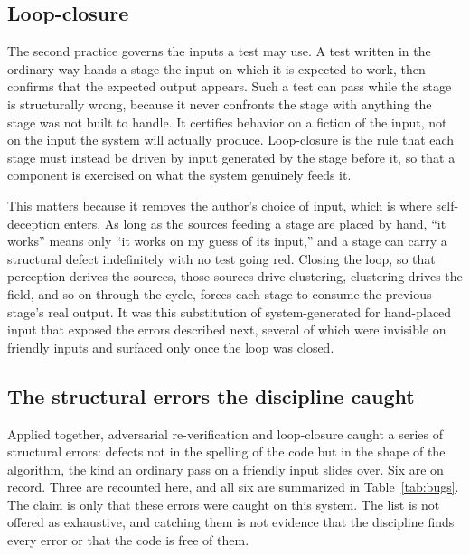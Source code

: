 \documentclass[11pt]{article}
\begin{document}
\subsection{Loop-closure}

The second practice governs the inputs a test may use. A test written in the ordinary
way hands a stage the input on which it is expected to work, then confirms that the
expected output appears. Such a test can pass while the stage is structurally wrong,
because it never confronts the stage with anything the stage was not built to handle. It
certifies behavior on a fiction of the input, not on the input the system will actually
produce. Loop-closure is the rule that each stage must instead be driven by input
generated by the stage before it, so that a component is exercised on what the system
genuinely feeds it.

This matters because it removes the author's choice of input, which is where
self-deception enters. As long as the sources feeding a stage are placed by hand,
``it works'' means only ``it works on my guess of its input,'' and a stage can carry a
structural defect indefinitely with no test going red. Closing the loop, so that
perception derives the sources, those sources drive clustering, clustering drives the
field, and so on through the cycle, forces each stage to consume the previous stage's
real output. It was this substitution of system-generated for hand-placed input that
exposed the errors described next, several of which were invisible on friendly inputs
and surfaced only once the loop was closed.

\subsection{The structural errors the discipline caught}

Applied together, adversarial re-verification and loop-closure caught a series of
structural errors: defects not in the spelling of the code but in the shape of the
algorithm, the kind an ordinary pass on a friendly input slides over. Six are on record.
Three are recounted here, and all six are summarized in Table~\ref{tab:bugs}. The claim
is only that these errors were caught on this system. The list is not offered as
exhaustive, and catching them is not evidence that the discipline finds every error or
that the code is free of them.
\end{document}
